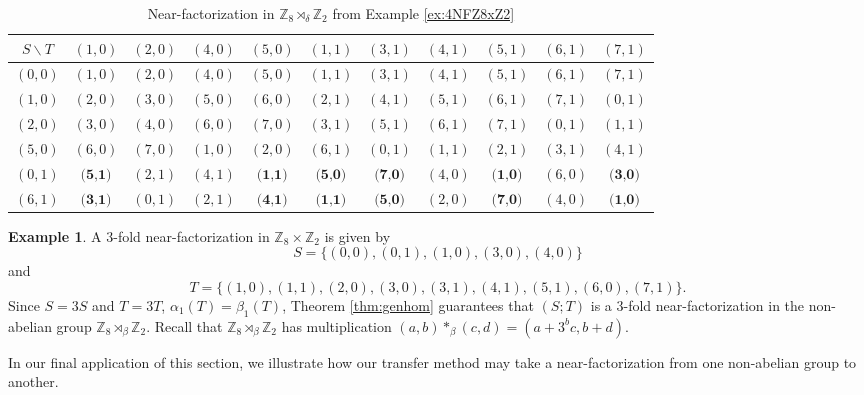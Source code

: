 \documentclass[12pt, a4paper]{article}
\theoremstyle{definition}
\newtheorem{example}[theorem]{Example}
\begin{document}
\begin{table}[h]
\renewcommand{\arraystretch}{1.2}
\centering
\setlength\tabcolsep{3pt}
\begin{tabular}{|c|cccccccccc|} 
\hline
$S \backslash T$ & $(1,0)$ & $(2,0)$ & $(4,0)$ & $(5,0)$ & $(1,1)$ & $(3,1)$ & $(4,1)$ & $(5,1)$ & $(6,1)$ & $(7,1)$  \\ \hline
$(0,0)$ & $(1,0)$ & $(2,0)$ & $(4,0)$ & $(5,0)$ & $(1,1)$ & $(3,1)$ & $(4,1)$ & $(5,1)$ & $(6,1)$ & $(7,1)$ 
\\
$(1,0)$ & $(2,0)$ & $(3,0)$ & $(5,0)$ & $(6,0)$ & $(2,1)$ & $(4,1)$ & $(5,1)$ & $(6,1)$ & $(7,1)$ & $(0,1)$ 
\\
$(2,0)$ & $(3,0)$ & $(4,0)$ & $(6,0)$ & $(7,0)$ & $(3,1)$ & $(5,1)$ & $(6,1)$ & $(7,1)$ & $(0,1)$ & $(1,1)$ 
\\
$(5,0)$ & $(6,0)$ & $(7,0)$ & $(1,0)$ & $(2,0)$ & $(6,1)$ & $(0,1)$ & $(1,1)$ & $(2,1)$ & $(3,1)$ & $(4,1)$ 
\\
$(0,1)$ & $\textbf{(5,1)}$ & $(2,1)$ & $(4,1)$ & $\textbf{(1,1)}$ & $\textbf{(5,0)}$ & $\textbf{(7,0)}$ & $(4,0)$ & $\textbf{(1,0)}$ & $(6,0)$ & $\textbf{(3,0)}$ 
\\
$(6,1)$ & $\textbf{(3,1)}$ & $(0,1)$ & $(2,1)$ & $\textbf{(4,1)}$ & $\textbf{(1,1)}$ & $\textbf{(5,0)}$ & $(2,0)$ & $\textbf{(7,0)}$ & $(4,0)$ & $\textbf{(1,0)}$ 
\\
\hline
\end{tabular}
\caption{Near-factorization in $\mathbb{Z}_8 \rtimes_{\delta} \mathbb{Z}_2$ from Example \ref{ex:4NFZ8xZ2}}
\label{table:4NFZ_8betaZ_2}
\end{table}

\begin{example}\label{ex:3NFZ8xZ2}
A $3$-fold near-factorization in $\mathbb{Z}_8 \times \mathbb{Z}_2$ is given by 
$$S=\{(0,0),(0,1),(1,0),(3,0),(4,0)\}$$
and 
$$T=\{(1,0),(1,1),(2,0),(3,0),(3,1),(4,1),(5,1),(6,0),(7,1)\}.$$  
Since $S=3S$ and $T=3T$, $\alpha_1(T)=\beta_1(T)$, Theorem \ref{thm:genhom} guarantees that $(S;T)$ is a $3$-fold near-factorization in the non-abelian group $\mathbb{Z}_8 \rtimes_{\beta} \mathbb{Z}_2$.  Recall that $\mathbb{Z}_8 \rtimes_{\beta} \mathbb{Z}_2$ has multiplication $(a,b) *_{\beta}(c,d)=(a+3^b c, b+d)$.
\end{example}

In our final application of this section, we illustrate how our transfer method may take a near-factorization from one non-abelian group to another.
\end{document}
